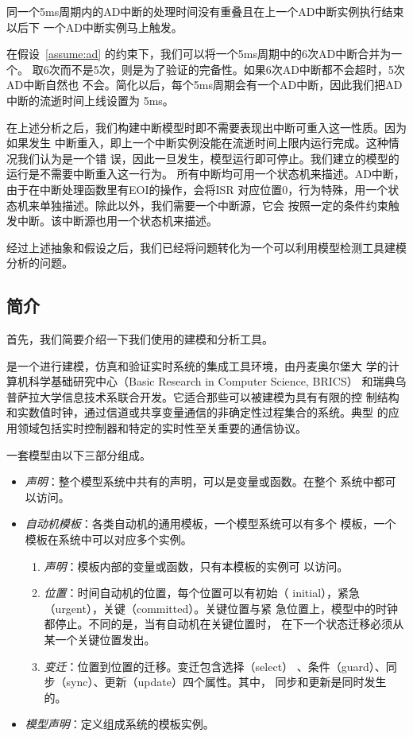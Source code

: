 \begin{assumption}
	同一个5ms周期内的AD中断的处理时间没有重叠且在上一个AD中断实例执行结束以后下
	一个AD中断实例马上触发。
	\label{assume:ad}
\end{assumption}

在假设~\ref{assume:ad} 的约束下，我们可以将一个5ms周期中的6次AD中断合并为一个。
取6次而不是5次，则是为了验证的完备性。如果6次AD中断都不会超时，5次AD中断自然也
不会。简化以后，每个5ms周期会有一个AD中断，因此我们把AD中断的流逝时间上线设置为
5ms。

在上述分析之后，我们构建中断模型时即不需要表现出中断可重入这一性质。因为如果发生
中断重入，即上一个中断实例没能在流逝时间上限内运行完成。这种情况我们认为是一个错
误，因此一旦发生，模型运行即可停止。我们建立的模型的运行是不需要中断重入这一行为。
所有中断均可用一个状态机来描述。AD中断，由于在中断处理函数里有EOI的操作，会将ISR
对应位置0，行为特殊，用一个状态机来单独描述。除此以外，我们需要一个中断源，它会
按照一定的条件约束触发中断。该中断源也用一个状态机来描述。

经过上述抽象和假设之后，我们已经将问题转化为一个可以利用模型检测工具建模分析的问题。

\subsection{\uppaal 简介}
\label{sec:Uppaal_intro}

首先，我们简要介绍一下我们使用的建模和分析工具\uppaal。

\uppaal 是一个进行建模，仿真和验证实时系统的集成工具环境，由丹麦奥尔堡大
学的计算机科学基础研究中心（Basic Research in Computer Science, BRICS）
和瑞典乌普萨拉大学信息技术系联合开发。它适合那些可以被建模为具有有限的控
制结构和实数值时钟，通过信道或共享变量通信的非确定性过程集合的系统。典型
的应用领域包括实时控制器和特定的实时性至关重要的通信协议。\cite{Behrmann04atutorial}

一套\uppaal 模型由以下三部分组成。
\begin{itemize}
	\item \emph{声明}：整个模型系统中共有的声明，可以是变量或函数。在整个
	系统中都可以访问。
	\item \emph{自动机模板}：各类自动机的通用模板，一个模型系统可以有多个
	模板，一个模板在系统中可以对应多个实例。
	\begin{enumerate}[(1)]
		\item \emph{声明}：模板内部的变量或函数，只有本模板的实例可
		以访问。
		\item \emph{位置}：时间自动机的位置，每个位置可以有初始（
		initial），紧急（urgent），关键（committed）。关键位置与紧
		急位置上，模型中的时钟都停止。不同的是，当有自动机在关键位置时，
		在下一个状态迁移必须从某一个关键位置发出。
		\item \emph{变迁}：位置到位置的迁移。变迁包含选择（select）
		、条件（guard）、同步（sync）、更新（update）四个属性。其中，
		同步和更新是同时发生的。
	\end{enumerate}	
	\item \emph{模型声明}：定义组成系统的模板实例。
\end{itemize}

